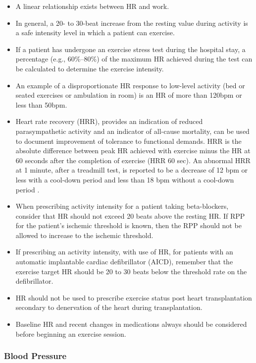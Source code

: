 \begin{itemize}
\item A linear relationship exists between HR and work.
\item In general, a 20- to 30-beat increase from the resting value during activity is a safe intensity level in which a patient can exercise.
\item If a patient has undergone an exercise stress test during the hospital stay, a percentage (e.g., 60\%–80\%) of the maximum HR achieved during the test can be calculated to determine the exercise intensity.
\item An example of a disproportionate HR response to low-level activity (bed or seated exercises or ambulation in room) is an HR of more than 120bpm or less than 50bpm.
\item Heart rate recovery (HRR), provides an indication of reduced parasympathetic activity and an indicator of all-cause mortality, can be used to document improvement of tolerance to functional demands. HRR is the absolute difference between peak HR achieved with exercise minus the HR at 60 seconds after the completion of exercise (HRR 60 sec).  An abnormal HRR at 1 minute, after a treadmill test, is reported to be a decrease of 12 bpm or less with a cool-down period and less than 18 bpm without a cool-down period \cite{collins_cardiac_2019}.
\item When prescribing activity intensity for a patient taking beta-blockers, consider that HR should not exceed 20 beats above the resting HR. If RPP for the patient's ischemic threshold is known, then the RPP should not be allowed to increase to the ischemic threshold.
\item If prescribing an activity intensity, with use of HR, for patients with an automatic implantable cardiac defibrillator (AICD), remember that the exercise target HR should be 20 to 30 beats below the threshold rate on the defibrillator.
\item HR should not be used to prescribe exercise status post heart transplantation secondary to denervation of the heart during transplantation.
\item Baseline HR and recent changes in medications always should be considered before beginning an exercise session.
\end{itemize}

\subsubsection{Blood Pressure}

